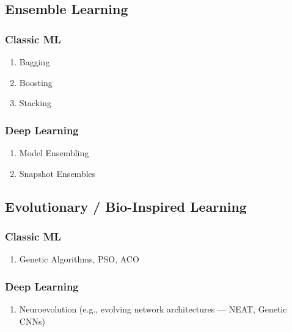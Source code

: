 \subsection*{Ensemble Learning}

\begin{table}[H]
\begin{minipage}{0.45\linewidth}
\subsubsection*{Classic ML}
\begin{enumerate}
    \item Bagging
    \item Boosting
    \item Stacking
\end{enumerate}
\end{minipage}
\begin{minipage}{0.45\linewidth}
\subsubsection*{Deep Learning}
\begin{enumerate}
    \item Model Ensembling
    \item Snapshot Ensembles
\end{enumerate}
\end{minipage}
\end{table}



\subsection*{Evolutionary / Bio-Inspired Learning}

\begin{table}[H]
\begin{minipage}{0.45\linewidth}
\subsubsection*{Classic ML}
\begin{enumerate}
    \item Genetic Algorithms, PSO, ACO
\end{enumerate}
\end{minipage}
\begin{minipage}{0.45\linewidth}
\subsubsection*{Deep Learning}
\begin{enumerate}
    \item Neuroevolution (e.g., evolving network architectures — NEAT, Genetic CNNs)
\end{enumerate}
\end{minipage}
\end{table}


